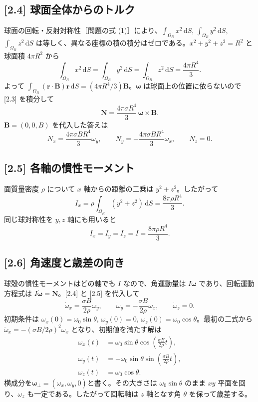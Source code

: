 \documentclass[11pt,a4paper]{article}
\begin{document}
\subsection*{[2.4] 球面全体からのトルク}
球面の回転・反射対称性［問題の式 (1)］により、$\int_{\Omega_R}x^2\,\mathrm dS$, $\int_{\Omega_R}y^2\,\mathrm dS$, $\int_{\Omega_R}z^2\,\mathrm dS$ は等しく、異なる座標の積の積分はゼロである。$x^2+y^2+z^2=R^2$ と球面積 $4\pi R^2$ から
\[
\int_{\Omega_R}x^2\,\mathrm dS
=\int_{\Omega_R}y^2\,\mathrm dS
=\int_{\Omega_R}z^2\,\mathrm dS
=\frac{4\pi R^4}{3}.
\]
よって $\int_{\Omega_R}(\boldsymbol r\cdot\boldsymbol B)\boldsymbol r\,\mathrm dS=(4\pi R^4/3)\boldsymbol B$。$\boldsymbol\omega$ は球面上の位置に依らないので [2.3] を積分して
\[
\boldsymbol N=\frac{4\pi\sigma R^4}{3}\,\boldsymbol\omega\times\boldsymbol B.
\]
$\boldsymbol B=(0,0,B)$ を代入した答えは
\[
\boxed{N_x=\frac{4\pi\sigma BR^4}{3}\omega_y,\qquad
N_y=-\frac{4\pi\sigma BR^4}{3}\omega_x,\qquad N_z=0}.
\]

\subsection*{[2.5] 各軸の慣性モーメント}
面質量密度 $\rho$ について $x$ 軸からの距離の二乗は $y^2+z^2$。したがって
\[
I_x=\rho\int_{\Omega_R}(y^2+z^2)\,\mathrm dS
=\frac{8\pi\rho R^4}{3}.
\]
同じ球対称性を $y,z$ 軸にも用いると
\[
\boxed{I_x=I_y=I_z=I=\frac{8\pi\rho R^4}{3}}.
\]

\subsection*{[2.6] 角速度と歳差の向き}
球殻の慣性モーメントはどの軸でも $I$ なので、角運動量は $I\boldsymbol\omega$ であり、回転運動方程式は $I\dot{\boldsymbol\omega}=\boldsymbol N$。[2.4] と [2.5] を代入して
\[
\dot\omega_x=\frac{\sigma B}{2\rho}\omega_y,\qquad
\dot\omega_y=-\frac{\sigma B}{2\rho}\omega_x,\qquad
\dot\omega_z=0.
\]
初期条件は $\omega_x(0)=\omega_0\sin\theta$, $\omega_y(0)=0$, $\omega_z(0)=\omega_0\cos\theta$。最初の二式から $\ddot\omega_x=-(\sigma B/2\rho)^2\omega_x$ となり、初期値を満たす解は
\[
\boxed{\begin{aligned}
\omega_x(t)&=\omega_0\sin\theta\cos\!\left(\frac{\sigma B}{2\rho}t\right),\\
\omega_y(t)&=-\omega_0\sin\theta\sin\!\left(\frac{\sigma B}{2\rho}t\right),\\
\omega_z(t)&=\omega_0\cos\theta.
\end{aligned}}
\]
横成分を$\boldsymbol\omega_\perp=(\omega_x,\omega_y,0)$と書く。その大きさは $\omega_0\sin\theta$ のまま $xy$ 平面を回り、$\omega_z$ も一定である。したがって回転軸は $z$ 軸となす角 $\theta$ を保って歳差する。
\end{document}
